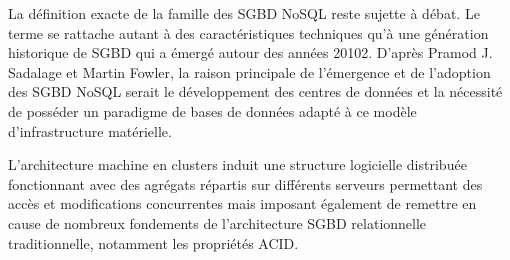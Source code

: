 La définition exacte de la famille des SGBD NoSQL reste sujette à débat.
Le terme se rattache autant à des caractéristiques techniques qu'à une génération
historique de SGBD qui a émergé autour des années 20102. D'après Pramod J. Sadalage et Martin Fowler,
la raison principale de l'émergence et de l'adoption des SGBD NoSQL serait le développement des
centres de données et la nécessité de posséder un paradigme de bases de données adapté à ce modèle
d'infrastructure matérielle.

L'architecture machine en clusters induit une structure logicielle distribuée fonctionnant
avec des agrégats répartis sur différents serveurs permettant des accès et modifications
concurrentes mais imposant également de remettre en cause de nombreux fondements de
l'architecture SGBD relationnelle traditionnelle, notamment les propriétés ACID.
